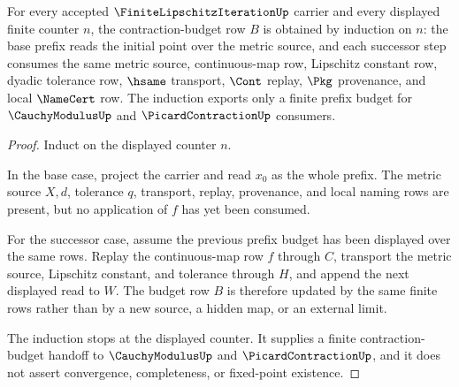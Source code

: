 \begin{theorem}
\label{thm:finite-lipschitz-iteration-contraction-budget-induction}
For every accepted $\FiniteLipschitzIterationUp$ carrier and every displayed finite counter $n$, the contraction-budget row $B$ is obtained by induction on $n$: the base prefix reads the initial point over the metric source, and each successor step consumes the same metric source, continuous-map row, Lipschitz constant row, dyadic tolerance row, $\hsame$ transport, $\Cont$ replay, $\Pkg$ provenance, and local $\NameCert$ row. The induction exports only a finite prefix budget for $\CauchyModulusUp$ and $\PicardContractionUp$ consumers.
\end{theorem}
\begin{proof}
Induct on the displayed counter $n$.

In the base case, project the carrier and read $x_0$ as the whole prefix. The metric source $X,d$, tolerance $q$, transport, replay, provenance, and local naming rows are present, but no application of $f$ has yet been consumed.

For the successor case, assume the previous prefix budget has been displayed over the same rows. Replay the continuous-map row $f$ through $C$, transport the metric source, Lipschitz constant, and tolerance through $H$, and append the next displayed read to $W$. The budget row $B$ is therefore updated by the same finite rows rather than by a new source, a hidden map, or an external limit.

The induction stops at the displayed counter. It supplies a finite contraction-budget handoff to $\CauchyModulusUp$ and $\PicardContractionUp$, and it does not assert convergence, completeness, or fixed-point existence.
\end{proof}


\begin{closurestatus}{\FiniteLipschitzIterationUp}
  \theoryclosure{\seedClosure}
  \formalstatus{\unformalizedV}
\end{closurestatus}
